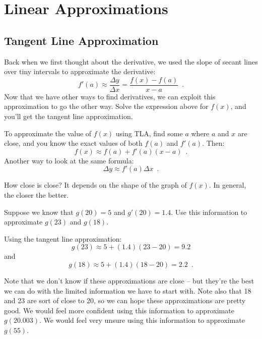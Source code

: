 \section{Linear Approximations}
\label{sec:linapprox}

\subsection{Tangent Line Approximation}
Back when we first thought about the derivative, we used the slope of secant lines over tiny intervals to approximate the derivative:
$$f'(a)\approx  \dfrac{\Delta y}{\Delta x} = \dfrac{f(x)-f(a)}{x-a} \enspace .$$
Now that we have other ways to find derivatives, we can exploit this approximation to go the other way. Solve the expression above for $f(x)$, and you'll get the tangent line approximation.

\begin{definition}
To approximate the value of $f(x)$ using TLA, find some $a$ where $a$ and $x$ are close, and you know the exact values of both $f(a)$ and $f'(a)$. Then:
$$f(x)\approx   f(a)+f'(a)(x-a) \enspace .$$
Another way to look at the same formula:
$$\Delta y\approx   f'(a)\Delta x \enspace .$$
\end{definition}

How close is close? It depends on the shape of the graph of $f(x)$. In general, the closer the better.

\begin{example}
Suppose we know that $g(20)=5$ and $g'(20)=1.4$. Use this information to approximate $g(23)$ and $g(18)$.

\begin{solution} Using the tangent line approximation:
$$g(23)\approx 5+(1.4)(23-20)=9.2$$
and
$$g(18)\approx 5+(1.4)(18-20)=2.2 \enspace .$$
\end{solution}\end{example}
Note that we don't know if these approximations are close – but they're the best we can do with the limited information we have to start with. Note also that 18 and 23 are sort of close to 20, so we can hope these approximations are pretty good. We would feel more confident using this information to approximate $g(20.003)$. We would feel very unsure using this information to approximate $g(55)$.

